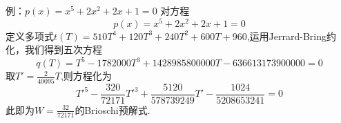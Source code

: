 \documentclass[pdf]{beamer}
\numberwithin{equation}{section}
\theoremstyle{plain}
\theoremstyle{plain}
\theoremstyle{remark}
\begin{document}
\begin{frame}{例：$p(x)=x^5+2x^2+2x+1=0$}
对方程
$$p(x)=x^5+2x^2+2x+1=0$$
定义多项式$t(T)=510T^4+120T^3+240T^2+600T+960$,运用Jerrard-Bring约化，我们得到五次方程
\begin{equation*}
q(T)=T^5-1782000T^3+1428985800000T-636613173900000 =0
\end{equation*}
取$T'=\frac{2}{40095}T$,则方程化为
\begin{equation*}
T'^5-\frac{320}{72171}T'^3+\frac{5120}{578739249}T'-\frac{1024}{5208653241}=0
\end{equation*}
此即为$W=\frac{32}{72171}$的Brioschi预解式.
\end{frame}





\end{document}
